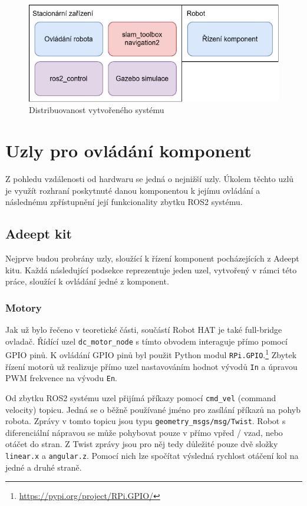 \begin{figure}[h!]
	\centering
	\includegraphics[scale=0.75]{obrazky-figures/distribuovanost.pdf}
	\caption{Distribuovanost vytvořeného systému}
	\label{fig:distribuovanost}
\end{figure}

\section{Uzly pro ovládání komponent}
Z pohledu vzdálenosti od hardwaru se jedná o nejnižší uzly. Úkolem těchto uzlů je využít rozhraní poskytnuté danou komponentou k jejímu ovládání a následnému zpřístupnění její funkcionality zbytku ROS2 systému.

\subsection*{Adeept kit}
Nejprve budou probrány uzly, sloužící k řízení komponent pocházejících z Adeept kitu. Každá následující podsekce reprezentuje jeden uzel, vytvořený v rámci této práce, sloužící k ovládání jedné z komponent.

\subsubsection*{Motory} \label{implementation:motors}
Jak už bylo řečeno v teoretické části, součástí Robot HAT je také full-bridge ovladač. Řídící uzel \verb|dc_motor_node| s tímto obvodem interaguje přímo pomocí GPIO pinů. K ovládání GPIO pinů byl použit Python modul \verb|RPi.GPIO|.\footnote{\url{https://pypi.org/project/RPi.GPIO/}} Zbytek řízení motorů už realizuje přímo uzel nastavováním hodnot vývodů \verb|In| a úpravou PWM frekvence na vývodu \verb|En|.

Od zbytku ROS2 systému uzel přijímá příkazy pomocí \verb|cmd_vel| (command velocity) topicu. Jedná se o běžně používané jméno pro zasílání příkazů na pohyb robota. Zprávy v tomto topicu jsou typu \verb|geometry_msgs/msg/Twist|. Robot s diferenciální nápravou se může pohybovat pouze v přímo vpřed / vzad, nebo otáčet do stran. Z Twist zprávy jsou pro něj tedy důležité pouze dvě složky \verb|linear.x| a \verb|angular.z|. Pomocí nich lze spočítat výsledná rychlost otáčení kol na jedné a druhé straně.

